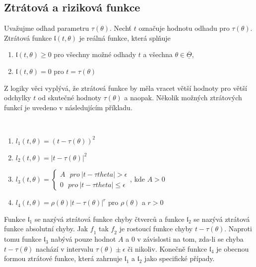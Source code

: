 \subsection{Ztrátová a riziková funkce}

\begin{definition}
Uvažujme odhad parametru $\tau(\theta)$. Nechť $t$ označuje hodnotu odhadu pro $\tau(\theta)$. Ztrátová funkce $\mathfrak{l}(t, \theta)$ je reálná funkce, která splňuje
\begin{enumerate}
\item $\mathfrak{l}(t, \theta) \ge 0$ pro všechny možné odhady $t$ a všechna $\theta \in \underline{\overline{\Theta}}$,
\item $\mathfrak{l}(t, \theta) = 0$ pro $t = \tau(\theta)$
\end{enumerate}
\end{definition}

Z logiky věci vyplývá, že ztrátová funkce by měla vracet  větší hodnoty pro větší odchylky $t$ od skutečné hodnoty $\tau(\theta)$ a naopak. Několik možných ztrátových funkcí je uvedeno v následujícím příkladu.

\begin{example}
~
\begin{enumerate}
\item $\mathit{l_1}(t, \theta) = (t - \tau(\theta))^2$
\item $\mathit{l_2}(t, \theta) = |t - \tau(\theta)|^2$
\item $\mathit{l_3}(t, \theta) = \begin{cases}A ~~~ \textit{pro} ~ |t - \tau{theta}| > \epsilon\\ 0 ~~~ \textit{pro} ~ |t - \tau{theta}| \le \epsilon \end{cases}$, kde $A > 0$
\item $\mathit{l_4}(t, \theta) = \rho(\theta)|t - \tau(\theta)|^r$ pro $\rho(\theta)$ a $r > 0$
\end{enumerate}
Funkce $\mathfrak{l}_1$ se nazývá ztrátová funkce chyby čtverců a funkce $\mathfrak{l}_2$ se nazývá ztrátová funkce absolutní chyby. Jak $\mathit{f}_1$ tak $\mathit{f}_2$ je rostoucí funkce chyby $t - \tau(\theta)$. Naproti tomu funkce $\mathfrak{l}_3$ nabývá pouze hodnot $A$ a 0 v závislosti na tom, zda-li se chyba $t- \tau(\theta)$ nachází v intervalu $\tau(\theta) \pm \epsilon$ či nikoliv. Konečně funkce $\mathfrak{l}_4$ je obecnou formou ztrátové funkce, která zahrnuje $\mathfrak{l}_1$ a $\mathfrak{l}_2$ jako specifické případy.
\end{example}

